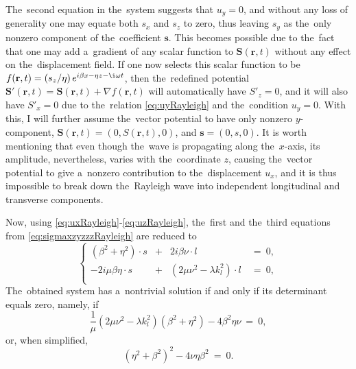 The~second equation in the~system suggests that $u_y = 0$, and without any loss of generality one may equate both $s_x$ and $s_z$ to zero, thus leaving $s_y$ as the~only nonzero component of the~coefficient $\mathbf{s}$.
This becomes possible due to the~fact that one may add a~gradient of any scalar function to $\mathbf{S}(\mathbf{r}, t)$ without any effect on the~displacement field.
If one now selects this scalar function to be $f(\mathbf{r}, t) = \left(s_z/\eta\right) e^{i\beta x-\eta z-\i\omega t}$, then the~redefined potential $\mathbf{S}'(\mathbf{r}, t) = \mathbf{S}(\mathbf{r}, t) + \nabla f(\mathbf{r}, t)$ will automatically have $S'_z = 0$, and it will also have $S'_x = 0$ due to the~relation \cref{eq:uyRayleigh} and the~condition $u_y=0$.
With this, I will further assume the~vector potential to have only nonzero $y$-component, $\mathbf{S}(\mathbf{r}, t) = \left(0, S(\mathbf{r}, t), 0\right)$, and $\mathbf{s}=\left(0,s,0\right)$.
It is worth mentioning that even though the~wave is propagating along the~$x$-axis, its amplitude, nevertheless, varies with the~coordinate $z$, causing the~vector potential to give a~nonzero contribution to the~displacement $u_x$, and it is thus impossible to break down the~Rayleigh wave into independent longitudinal and transverse components.

Now, using \cref{eq:uxRayleigh}-\cref{eq:uzRayleigh}, the~first and the~third equations from \cref{eq:sigmaxzyzzzRayleigh} are reduced to
\begin{equation}
\left\{\begin{array}{rrrr}
\left(\beta^2+\eta^2\right)\cdot s &+&2i\beta\nu\cdot l~&=~0, \\
-2i\mu\beta\eta\cdot s &+& \left(2\mu\nu^2-\lambda k_l^2\right)\cdot l~&=~0, \\
\end{array}\right.
\end{equation}
The~obtained system has a~nontrivial solution if and only if its determinant equals zero, namely, if
\begin{equation}
\frac{1}{\mu}\left(2\mu\nu^2-\lambda k_l^2\right)\left(\beta^2+\eta^2\right)-4\beta^2\eta\nu~=~0,
\end{equation}
or, when simplified,
\begin{equation}
\left(\eta^2+\beta^2\right)^2-4\nu\eta\beta^2~=~0.
\end{equation}

